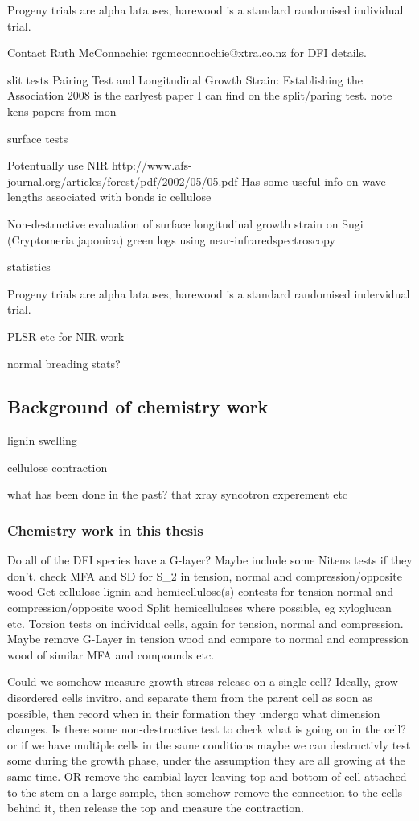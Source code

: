 \documentclass{article}
\begin{document}
Progeny trials are alpha latauses, harewood is a standard randomised individual
trial.

Contact Ruth McConnachie: rgcmcconnochie@xtra.co.nz for DFI details.

slit tests
Pairing Test and Longitudinal Growth Strain: Establishing the Association 2008
is the earlyest paper I can find on the split/paring test. note kens papers from
mon

surface tests

Potentually use NIR
http://www.afs-journal.org/articles/forest/pdf/2002/05/05.pdf
Has some useful info on wave lengths associated with bonds ic cellulose

Non-destructive evaluation of surface longitudinal growth strain
on Sugi (Cryptomeria japonica) green logs using near-infraredspectroscopy

statistics

Progeny trials are alpha latauses, harewood is a standard randomised indervidual
trial.

PLSR etc for NIR work

normal breading stats?

\subsection{Background of chemistry work}

lignin swelling

cellulose contraction

what has been done in the past?
that xray syncotron experement etc

\subsubsection{Chemistry work in this thesis}

Do all of the DFI species have a G-layer?
Maybe include some Nitens tests if they don't.
check MFA and SD for S\_2 in tension, normal and compression/opposite wood
Get cellulose lignin and hemicellulose(s) contests for tension normal and
compression/opposite wood Split hemicelluloses where possible, eg xyloglucan
etc.
Torsion tests on individual cells, again for tension, normal and compression. Maybe remove G-Layer
in tension wood and compare to normal and compression wood of similar MFA and compounds etc.

Could we somehow measure growth stress release on a single cell?
Ideally, grow disordered cells invitro, and separate them from the parent cell
as soon as possible, then record when in their formation they undergo what
dimension changes. Is there some non-destructive test to check what is going on in the cell? or if we have multiple cells in the same conditions maybe we can destructivly test some during the growth phase, under the assumption they are all growing at the same time.
OR
remove the cambial layer leaving top and bottom of cell attached to the stem on a large sample,
then somehow remove the connection to the cells behind it, then release the top and measure the contraction.
\end{document}
